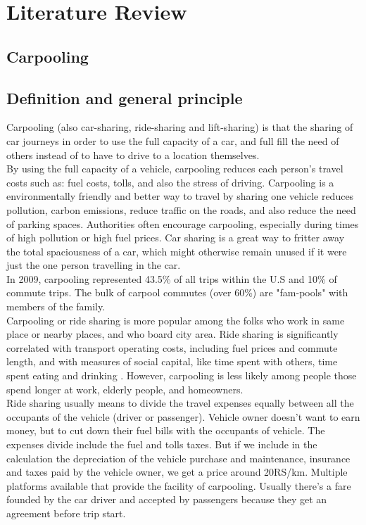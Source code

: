 \chapter{Literature Review} \label{chap:literatureReview}

\section*{Carpooling}

\section{Definition and general principle}
\justify
Carpooling (also car-sharing, ride-sharing and lift-sharing) is that the sharing of car journeys in order to use the full capacity of a car, and full fill the need of others instead of to have to drive to a location themselves.\\

By using the full capacity of a vehicle, carpooling reduces each person's travel costs 
such as: fuel costs, tolls, and also the stress of driving. Carpooling is a environmentally 
friendly and better way to travel by sharing one vehicle reduces pollution, carbon emissions, reduce traffic on the roads, and also reduce the need of parking spaces. Authorities often encourage carpooling, especially during times of high pollution or high fuel prices. Car sharing is a great way to  fritter away the total spaciousness of a car, which might otherwise remain unused if it were just the one person travelling in the car.\\

In 2009, carpooling represented 43.5\% of all trips within the U.S and 10\% of commute trips. The bulk of carpool commutes (over 60\%) are "fam-pools" with members of the family.\\

Carpooling or ride sharing is more popular among the folks who work in same place or nearby places, and who board city area. Ride sharing is significantly correlated with transport operating costs, including fuel prices and commute length, and with measures of social capital, like time spent with others, time spent eating and drinking . However, carpooling is less likely among people those spend longer at work, elderly people, and homeowners.\\

Ride sharing usually means to divide the travel expenses equally between all the occupants of the vehicle (driver or passenger). Vehicle owner doesn't want to earn money, but to cut down their fuel bills with the occupants of vehicle. The expenses divide include the fuel and tolls taxes. But if we include in the calculation the depreciation of the vehicle purchase and maintenance, insurance and taxes paid by the vehicle owner, we get a price around 20RS/km. Multiple platforms available that provide the facility of carpooling. Usually there's a fare founded by the car driver and accepted by passengers because they get an agreement before trip start.

